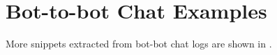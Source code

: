 


%



\appendix
\label{sec:appendix}
\section{Bot-to-bot Chat Examples}
More snippets extracted from bot-bot chat logs are shown in .

